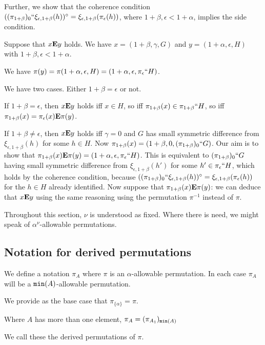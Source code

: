 \documentclass[12pt]{article}
\begin{document}
Further, we show that the coherence condition $((\pi_{1+\beta})_0``\xi_{\epsilon,1+\beta}(h))^{\circ}=\xi_{\epsilon,1+\beta}(\pi_\epsilon(h))$, where $1+\beta, \epsilon <1+\alpha$, implies the side condition.

Suppose that $x {\bf E} y$ holds.  We have $x = (1+\beta,\gamma, G)$ and $y = (1+\alpha,\epsilon,H)$ with $1+\beta,\epsilon <1+\alpha$.

We have $\pi(y) = \pi(1+\alpha,\epsilon,H) = (1+\alpha,\epsilon,\pi_\epsilon``H)$.

We have two cases.  Either $1+\beta=\epsilon$ or not.

If $1+\beta=\epsilon$, then $x {\bf E} y$ holds iff $x \in H$, so iff $\pi_{1+\beta}(x) \in \pi_{1+\beta}``H$, so iff $\pi_{1+\beta}(x) = \pi_\epsilon(x) {\bf E} \pi(y)$.

If $1+\beta \neq \epsilon$, then $x {\bf E} y$ holds iff $\gamma=0$ and $G$ has small symmetric difference from $\xi_{\epsilon,1+\beta}(h)$ for some $h \in H$.  Now $\pi_{1+\beta}(x) = (1+\beta,0,(\pi_{1+\beta})_0``G)$.  Our aim is to show
that $\pi_{1+\beta}(x)  {\bf E} \pi(y) = (1+\alpha,\epsilon,\pi_{\epsilon}``H)$.  This is equivalent to $(\pi_{1+\beta})_0``G$ having small symmetric difference from $\xi_{\epsilon,1+\beta}(h')$ for some $h' \in \pi_{\epsilon}``H$, which holds by the coherence condition, because $((\pi_{1+\beta})_0``\xi_{\epsilon,1+\beta}(h))^{\circ}=\xi_{\epsilon,1+\beta}(\pi_\epsilon(h))$ for the $h \in H$ already identified.  Now suppose that $\pi_{1+\beta}(x) {\bf E} \pi(y)$:  we can deduce that $x {\bf E}y$ using the same reasoning using the permutation $\pi^{-1}$ instead of $\pi$.

Throughout this section, $\nu$ is understood as fixed.  Where there is need, we might speak of $\alpha^\nu$-allowable permutations.

\subsection{Notation for derived permutations}

We define a notation $\pi_A$ where $\pi$ is an $\alpha$-allowable permutation.  In each case $\pi_A$ will be a ${\tt min}(A)$-allowable permutation.

We provide as the base case that $\pi_{\{\alpha\}} = \pi$.

Where $A$ has more than one element, $\pi_A = (\pi_{A_1})_{{\tt min}(A)}$

We call these the derived permutations of $\pi$.
\end{document}
